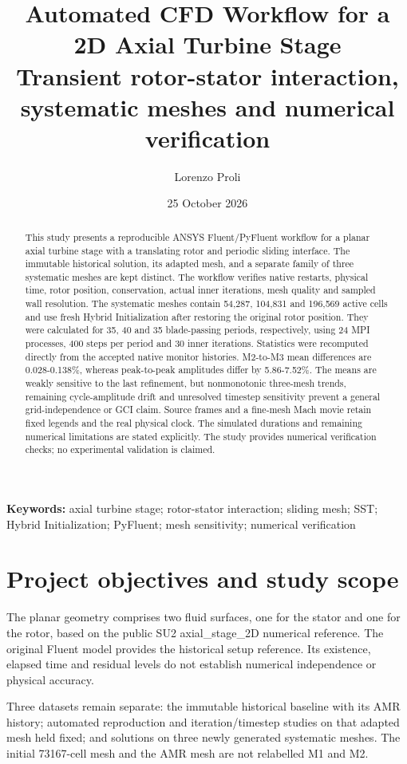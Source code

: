 \documentclass[11pt,a4paper]{article}
\title{\textbf{Automated CFD Workflow for a 2D Axial Turbine Stage}\\[0.4em]\large Transient rotor-stator interaction, systematic meshes and numerical verification}
\author{Lorenzo Proli}
\date{25 October 2026}
\newcommand{\keywords}[1]{\begin{center}\begin{minipage}{0.86\linewidth}\small\textbf{Keywords:} #1\end{minipage}\end{center}\vspace{0.6em}}
\begin{document}
\maketitle
\begin{abstract}
This study presents a reproducible ANSYS Fluent/PyFluent workflow for a planar axial turbine stage with a translating rotor and periodic sliding interface. The immutable historical solution, its adapted mesh, and a separate family of three systematic meshes are kept distinct. The workflow verifies native restarts, physical time, rotor position, conservation, actual inner iterations, mesh quality and sampled wall resolution. The systematic meshes contain 54,287, 104,831 and 196,569 active cells and use fresh Hybrid Initialization after restoring the original rotor position. They were calculated for 35, 40 and 35 blade-passing periods, respectively, using 24 MPI processes, 400 steps per period and 30 inner iterations. Statistics were recomputed directly from the accepted native monitor histories. M2-to-M3 mean differences are 0.028-0.138\%, whereas peak-to-peak amplitudes differ by 5.86-7.52\%. The means are weakly sensitive to the last refinement, but nonmonotonic three-mesh trends, remaining cycle-amplitude drift and unresolved timestep sensitivity prevent a general grid-independence or GCI claim. Source frames and a fine-mesh Mach movie retain fixed legends and the real physical clock. The simulated durations and remaining numerical limitations are stated explicitly. The study provides numerical verification checks; no experimental validation is claimed.
\end{abstract}
\keywords{axial turbine stage; rotor-stator interaction; sliding mesh; SST; Hybrid Initialization; PyFluent; mesh sensitivity; numerical verification}
\tableofcontents
\clearpage
\FloatBarrier
\section{Project objectives and study scope}
The planar geometry comprises two fluid surfaces, one for the stator and one for the rotor, based on the public SU2 axial\_stage\_2D numerical reference. The original Fluent model provides the historical setup reference. Its existence, elapsed time and residual levels do not establish numerical independence or physical accuracy.\par

Three datasets remain separate: the immutable historical baseline with its AMR history; automated reproduction and iteration/timestep studies on that adapted mesh held fixed; and solutions on three newly generated systematic meshes. The initial 73167-cell mesh and the AMR mesh are not relabelled M1 and M2.\par
\end{document}

